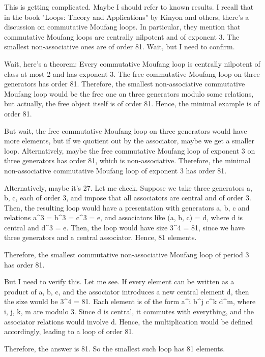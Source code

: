 \documentclass[12p]{article}
\newcounter{reasoningcounter}
\newenvironment{reasoning}[1][]
{\refstepcounter{reasoningcounter}%
\begin{tcolorbox}[
    title=Reasoning \thereasoningcounter: #1,
    colback=white, %
    colframe=gray,
    coltext=black, %
    fonttitle=\bfseries\normalsize,
    top=2mm,
    bottom=2mm,
    enlarge top initially by=5mm
]
\small
}
{\end{tcolorbox}}
\begin{document}
\begin{reasoning}
This is getting complicated. Maybe I should refer to known results. I recall that in the book "Loops: Theory and Applications" by Kinyon and others, there's a discussion on commutative Moufang loops. In particular, they mention that commutative Moufang loops are centrally nilpotent and of exponent 3. The smallest non-associative ones are of order 81. Wait, but I need to confirm.

Wait, here's a theorem: Every commutative Moufang loop is centrally nilpotent of class at most 2 and has exponent 3. The free commutative Moufang loop on three generators has order 81. Therefore, the smallest non-associative commutative Moufang loop would be the free one on three generators modulo some relations, but actually, the free object itself is of order 81. Hence, the minimal example is of order 81.

But wait, the free commutative Moufang loop on three generators would have more elements, but if we quotient out by the associator, maybe we get a smaller loop. Alternatively, maybe the free commutative Moufang loop of exponent 3 on three generators has order 81, which is non-associative. Therefore, the minimal non-associative commutative Moufang loop of exponent 3 has order 81.

Alternatively, maybe it's 27. Let me check. Suppose we take three generators a, b, c, each of order 3, and impose that all associators are central and of order 3. Then, the resulting loop would have a presentation with generators a, b, c and relations a^3 = b^3 = c^3 = e, and associators like (a, b, c) = d, where d is central and d^3 = e. Then, the loop would have size 3^4 = 81, since we have three generators and a central associator. Hence, 81 elements.

Therefore, the smallest commutative non-associative Moufang loop of period 3 has order 81.

But I need to verify this. Let me see. If every element can be written as a product of a, b, c, and the associator introduces a new central element d, then the size would be 3^4 = 81. Each element is of the form a^i b^j c^k d^m, where i, j, k, m are modulo 3. Since d is central, it commutes with everything, and the associator relations would involve d. Hence, the multiplication would be defined accordingly, leading to a loop of order 81.

Therefore, the answer is 81. So the smallest such loop has 81 elements.

\end{reasoning}
\end{document}
